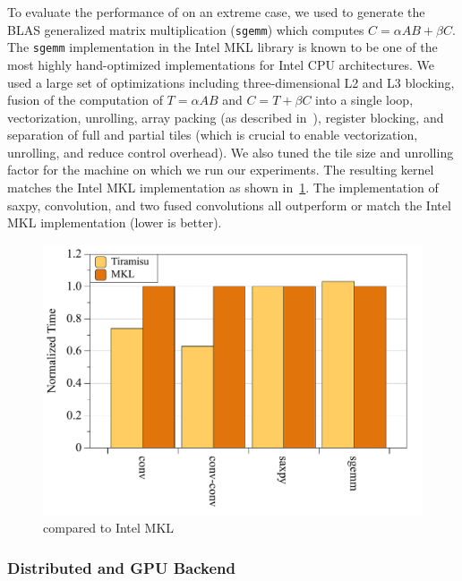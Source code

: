 To evaluate the performance of \framework{} on an extreme case, we used \framework{} to generate the BLAS generalized matrix multiplication (\texttt{sgemm}) which computes $C = \alpha AB+\beta C$.  The \texttt{sgemm} implementation in the Intel MKL library is known to be one of the most highly hand-optimized implementations for Intel CPU architectures.  We used a large set of optimizations including three-dimensional L2 and L3 blocking, fusion of the computation of $T = \alpha AB$ and $C = T + \beta C$ into a single loop, vectorization, unrolling, array packing (as described in~\cite{Goto:2008:AHM:1356052.1356053}), register blocking, and separation of full and partial tiles (which is crucial to enable vectorization, unrolling, and reduce control overhead). We also tuned the tile size and unrolling factor for the machine on which we run our experiments.  The resulting kernel matches the Intel MKL implementation as shown in~\ref{tiravsmkl}.  The \framework{} implementation of saxpy, convolution, and two fused convolutions all outperform or match the Intel MKL implementation (lower is better).

\begin{figure}
\centering
 \includegraphics[width=0.8\columnwidth]{./figures/tiramisu_vs_mkl}
 \caption{\framework{} compared to Intel MKL}
 \label{tiravsmkl}
 \vspace{-0.5cm}
\end{figure}



\subsubsection{Distributed and GPU Backend}

